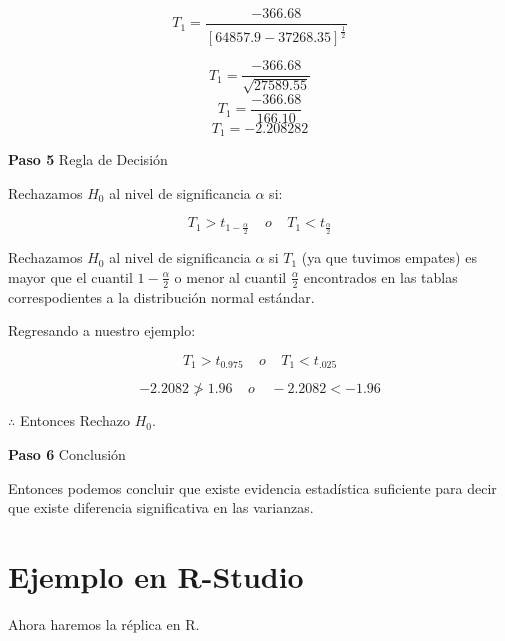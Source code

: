 \documentclass[
  a4paper,
  oneside,
  openany]{book}
\begin{document}
\[T_{1} = \frac{-366.68}{[64857.9-37268.35]^\frac{1}{2}}\]

\[T_{1} = \frac{-366.68}{\sqrt{27589.55}}\]
\[T_{1} = \frac{-366.68}{166.10}\]
\[T_{1}= -2.208282\]

\textbf{Paso 5} Regla de Decisión

Rechazamos \(H_0\) al nivel de significancia \(\alpha\) si:

\[T_{1}>t_{1-\frac{\alpha}{2}} \ \ \ \ \  o  \ \ \ \ \ T_{1}<t_{\frac{\alpha}{2}}\]

Rechazamos \(H_0\) al nivel de significancia \(\alpha\) si \(T_{1}\) (ya que tuvimos empates) es mayor que el cuantil \(1-\frac{\alpha}{2}\) o menor al cuantil \(\frac{\alpha}{2}\) encontrados en las tablas correspodientes a la distribución normal estándar.

Regresando a nuestro ejemplo:

\[T_{1}>t_{0.975} \ \ \ \ \  o \ \ \ \ \ T_{1}<t_{.025}\]

\[-2.2082 \ngtr 1.96  \ \ \ \ \   o  \ \ \ \ \  -2.2082 < -1.96\]

\(\therefore\) Entonces Rechazo \(H_0\).

\textbf{Paso 6} Conclusión

Entonces podemos concluir que existe evidencia estadística suficiente para decir que existe diferencia significativa en las varianzas.

\hypertarget{ejemplo-en-r-studio-7}{%
\section{Ejemplo en R-Studio}\label{ejemplo-en-r-studio-7}}

Ahora haremos la réplica en R.
\end{document}
